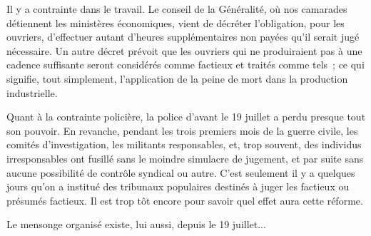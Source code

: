 \documentclass[french,twoside]{book} %
\begin{document}
Il y a contrainte dans le travail. Le conseil de la Généralité, où nos camarades détiennent les ministères économiques, vient de décréter l'obli­gation, pour les ouvriers, d'effectuer autant d'heures supplémentaires non payées qu'il serait jugé nécessaire. Un autre décret prévoit que les ouvriers qui ne produiraient pas à une cadence suffisante seront considérés comme factieux et traités comme tels ; ce qui signifie, tout simplement, l'application de la peine de mort dans la production industrielle.\par
Quant à la contrainte policière, la police d'avant le 19 juillet a perdu presque tout son pouvoir. En revanche, pendant les trois premiers mois de la guerre civile, les comités d'investigation, les militants responsables, et, trop souvent, des individus irresponsables ont fusillé sans le moindre simulacre de jugement, et par suite sans aucune possibilité de contrôle syndical ou autre. C'est seulement il y a quelques jours qu'on a institué des tribunaux populaires destinés à juger les factieux ou présumés factieux. Il est trop tôt encore pour savoir quel effet aura cette réforme.\par
Le mensonge organisé existe, lui aussi, depuis le 19 juillet...\par

\begin{center}
\end{center}
\end{document}
